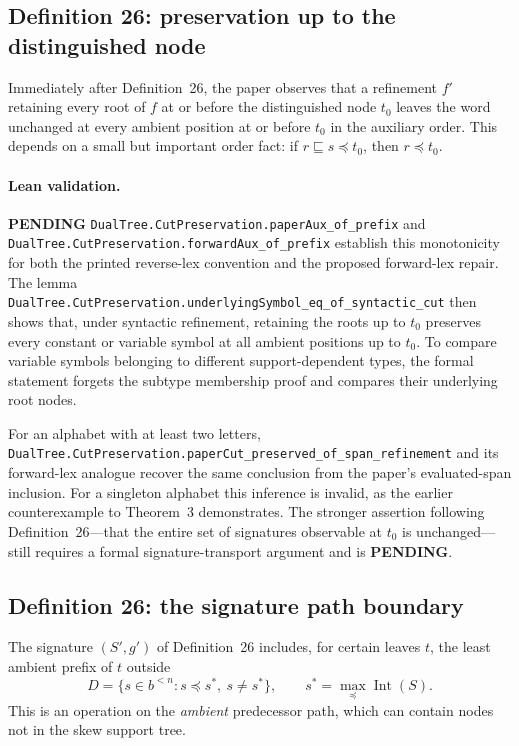 \documentclass[11pt]{article}
\newcommand{\todo}{\textcolor{gray!70!black}{\textbf{PENDING}}}
\newcommand{\lean}[1]{\texttt{#1}}
\begin{document}
\subsection{Definition 26: preservation up to the distinguished node}
Immediately after Definition~26, the paper observes that a refinement
$f'$ retaining every root of $f$ at or before the distinguished node $t_0$
leaves the word unchanged at every ambient position at or before $t_0$
in the auxiliary order.  This depends on a small but important order fact:
if $r\sqsubseteq s\preccurlyeq t_0$, then $r\preccurlyeq t_0$.

\paragraph{Lean validation.} \todo
\lean{DualTree.CutPreservation.paperAux_of_prefix} and
\lean{DualTree.CutPreservation.forwardAux_of_prefix} establish this monotonicity
for both the printed reverse-lex convention and the proposed forward-lex
repair.  The lemma
\lean{DualTree.CutPreservation.underlyingSymbol_eq_of_syntactic_cut}
then shows that, under syntactic refinement, retaining the roots up to $t_0$
preserves every constant or variable symbol at all ambient positions up to
$t_0$.  To compare variable symbols belonging to different support-dependent
types, the formal statement forgets the subtype membership proof and compares
their underlying root nodes.

For an alphabet with at least two letters,
\lean{DualTree.CutPreservation.paperCut_preserved_of_span_refinement}
and its forward-lex analogue recover the same conclusion from the paper's
evaluated-span inclusion.  For a singleton alphabet this inference is invalid,
as the earlier counterexample to Theorem~3 demonstrates.  The stronger
assertion following Definition~26---that the entire set of signatures observable
at $t_0$ is unchanged---still requires a formal signature-transport argument
and is \todo.

\subsection{Definition 26: the signature path boundary}
The signature $(S',g')$ of Definition~26 includes, for certain leaves $t$,
the least ambient prefix of $t$ outside
\[
D=\{s\in b^{<n}:s\preccurlyeq s^*,\ s\ne s^*\},
\qquad s^*=\max_{\preccurlyeq}\operatorname{Int}(S).
\]
This is an operation on the \emph{ambient} predecessor path, which can
contain nodes not in the skew support tree.
\end{document}
